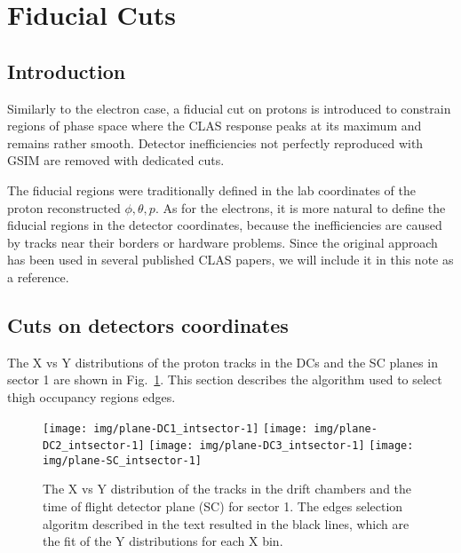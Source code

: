 \section{Fiducial Cuts}

\subsection{Introduction}

Similarly to the electron case, a fiducial cut on protons is introduced to constrain regions of phase space
where the CLAS response peaks at its maximum and remains rather smooth.
Detector inefficiencies not perfectly reproduced with GSIM are removed with dedicated cuts.

The fiducial regions were traditionally defined in the lab coordinates of the proton reconstructed $\phi, \theta, p$.
As for the electrons, it is more natural to define the fiducial regions in the detector coordinates, because
the inefficiencies are caused by tracks near their borders or hardware problems. Since the original approach
has been used in several published CLAS papers, we will include it in this note
as a reference.



\subsection{Cuts on detectors coordinates}

The X vs Y distributions of the proton tracks in the DCs and the SC planes in sector 1 are shown in Fig.~\ref{fig:xy_all_planes_s1}.
This section describes the algorithm used to select thigh occupancy regions edges.

\begin{figure}[h]
    \centering
    \texttt{[image: img/plane-DC1\_intsector-1]}
    \texttt{[image: img/plane-DC2\_intsector-1]}
    \texttt{[image: img/plane-DC3\_intsector-1]}
    \texttt{[image: img/plane-SC\_intsector-1]}
    \caption{The X vs Y distribution of the tracks in the drift chambers and the time
    of flight detector plane (SC) for sector 1. The edges selection algoritm described in the text resulted
    in the black lines, which are the fit of the Y distributions for each X bin.}
    \label{fig:xy_all_planes_s1}
\end{figure}

\clearpage\newpage

